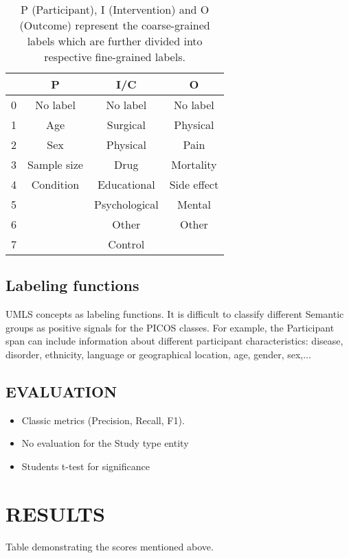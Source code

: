 \documentclass[10.7pt,]{article}
\begin{document}
\begin{table}[h!]
\begin{center}
\begin{tabular}{| c | c | c | c |} 
\hline
 & P & I/C & O \\ 
\hline
0 & No label & No label & No label \\ 
1 & Age & Surgical & Physical \\ 
2 & Sex & Physical & Pain \\
3 & Sample size & Drug & Mortality \\
4 & Condition & Educational & Side effect \\
5 &  & Psychological & Mental \\
6 &  & Other & Other \\
7 &  & Control &  \\
\hline
\end{tabular}
\caption{P (Participant), I (Intervention) and O (Outcome) represent the coarse-grained labels which are further divided into respective fine-grained labels.}
\label{table:coarsefineconcept}
\end{center}
\end{table}


%
%
%
\subsection{Labeling functions}\label{lfs}
%
UMLS concepts as labeling functions. It is difficult to classify different Semantic groups as positive signals for the PICOS classes. For example, the Participant span can include information about different participant characteristics: disease, disorder, ethnicity, language or geographical location, age, gender, sex,... 
%
%
%
\subsection{EVALUATION}\label{eval}
%
\begin{itemize}
    \item Classic metrics (Precision, Recall, F1).
    \item No evaluation for the Study type entity
    \item Students t-test for significance
\end{itemize}
%
%
%
\section{RESULTS}\label{results}
%
Table demonstrating the scores mentioned above.
%
%
%
\end{document}
